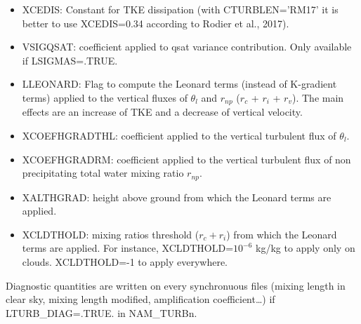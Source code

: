 \begin{itemize}
\item
{}
XCEDIS: Constant for TKE dissipation
(with CTURBLEN='RM17' it is better to use XCEDIS=0.34 according to Rodier et al., 2017).

\item
{}
VSIGQSAT: coefficient applied to qsat variance contribution. Only available if LSIGMAS=.TRUE.

\item
{}
LLEONARD: Flag to compute the Leonard terms (instead of K-gradient terms) applied to the vertical fluxes of $\theta_l$ and $r_{np}$ ($r_c$ + $r_i$ + $r_v$). The main effects are an increase of TKE and a decrease of vertical velocity.

\item
{}
XCOEFHGRADTHL: coefficient applied to the vertical turbulent flux of $\theta_l$.

\item
{}
XCOEFHGRADRM: coefficient applied to the vertical turbulent flux of non precipitating total water mixing ratio $r_{np}$.

\item
{}
XALTHGRAD: height above ground from which the Leonard terms are applied.

\item
{}
XCLDTHOLD: mixing ratios threshold ($r_c + r_i$) from which the Leonard terms are applied. For instance, XCLDTHOLD=$10^{-6}$ kg/kg to apply only on clouds. XCLDTHOLD=-1 to apply everywhere.

\end{itemize}

Diagnostic quantities are written on every synchronuous files 
(mixing length in clear sky, mixing length modified, amplification coefficient\ldots) if LTURB\_DIAG=.TRUE. in NAM\_TURBn.
